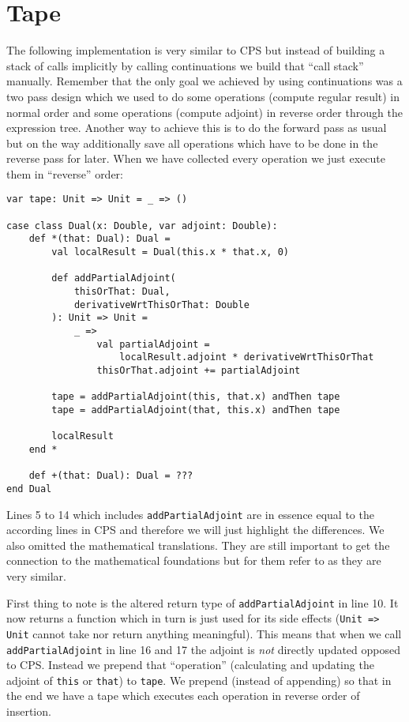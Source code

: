 \section{Tape}

The following implementation is very similar to CPS but instead of building a stack of calls implicitly by calling continuations we build that ``call stack'' manually. Remember that the only goal we achieved by using continuations was a two pass design which we used to do some operations (compute regular result) in normal order and some operations (compute adjoint) in reverse order through the expression tree. Another way to achieve this is to do the forward pass as usual but on the way additionally save all operations which have to be done in the reverse pass for later. When we have collected every operation we just execute them in ``reverse'' order:
\begin{lstlisting}[mathescape=true]
var tape: Unit => Unit = _ => ()

case class Dual(x: Double, var adjoint: Double):
    def *(that: Dual): Dual =
        val localResult = Dual(this.x * that.x, 0)

        def addPartialAdjoint(
            thisOrThat: Dual,
            derivativeWrtThisOrThat: Double
        ): Unit => Unit =
            _ =>
                val partialAdjoint = 
                    localResult.adjoint * derivativeWrtThisOrThat
                thisOrThat.adjoint += partialAdjoint

        tape = addPartialAdjoint(this, that.x) andThen tape
        tape = addPartialAdjoint(that, this.x) andThen tape

        localResult
    end *

    def +(that: Dual): Dual = ???
end Dual
\end{lstlisting}
Lines 5 to 14 which includes \lstinline{addPartialAdjoint} are in essence equal to the according lines in CPS and therefore we will just highlight the differences. We also omitted the mathematical translations. They are still important to get the connection to the mathematical foundations but for them refer to  as they are very similar.

First thing to note is the altered return type of \lstinline{addPartialAdjoint} in line 10. It now returns a function which in turn is just used for its side effects (\lstinline{Unit => Unit} cannot take nor return anything meaningful). This means that when we call \lstinline{addPartialAdjoint} in line 16 and 17 the adjoint is \emph{not} directly updated opposed to CPS. Instead we prepend that ``operation'' (calculating and updating the adjoint of \lstinline{this} or \lstinline{that}) to \lstinline{tape}. We prepend (instead of appending) so that in the end we have a tape which executes each operation in reverse order of insertion. 

